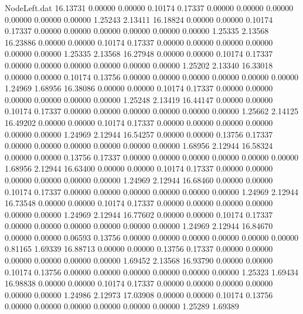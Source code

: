 \begin{filecontents}{NodeLeft.dat}
  16.13731    0.00000    0.00000     0.10174    0.17337    0.00000    0.00000    0.00000    0.00000    0.00000    0.00000    1.25243    2.13411
  16.18824    0.00000    0.00000     0.10174    0.17337    0.00000    0.00000    0.00000    0.00000    0.00000    0.00000    1.25335    2.13568
  16.23886    0.00000    0.00000     0.10174    0.17337    0.00000    0.00000    0.00000    0.00000    0.00000    0.00000    1.25335    2.13568
  16.27948    0.00000    0.00000     0.10174    0.17337    0.00000    0.00000    0.00000    0.00000    0.00000    0.00000    1.25202    2.13340
  16.33018    0.00000    0.00000     0.10174    0.13756    0.00000    0.00000    0.00000    0.00000    0.00000    0.00000    1.24969    1.68956
  16.38086    0.00000    0.00000     0.10174    0.17337    0.00000    0.00000    0.00000    0.00000    0.00000    0.00000    1.25248    2.13419
  16.44147    0.00000    0.00000     0.10174    0.17337    0.00000    0.00000    0.00000    0.00000    0.00000    0.00000    1.25662    2.14125
  16.49202    0.00000    0.00000     0.10174    0.17337    0.00000    0.00000    0.00000    0.00000    0.00000    0.00000    1.24969    2.12944
  16.54257    0.00000    0.00000     0.13756    0.17337    0.00000    0.00000    0.00000    0.00000    0.00000    0.00000    1.68956    2.12944
  16.58324    0.00000    0.00000     0.13756    0.17337    0.00000    0.00000    0.00000    0.00000    0.00000    0.00000    1.68956    2.12944
  16.63400    0.00000    0.00000     0.10174    0.17337    0.00000    0.00000    0.00000    0.00000    0.00000    0.00000    1.24969    2.12944
  16.68460    0.00000    0.00000     0.10174    0.17337    0.00000    0.00000    0.00000    0.00000    0.00000    0.00000    1.24969    2.12944
  16.73548    0.00000    0.00000     0.10174    0.17337    0.00000    0.00000    0.00000    0.00000    0.00000    0.00000    1.24969    2.12944
  16.77602    0.00000    0.00000     0.10174    0.17337    0.00000    0.00000    0.00000    0.00000    0.00000    0.00000    1.24969    2.12944
  16.84670    0.00000    0.00000     0.06593    0.13756    0.00000    0.00000    0.00000    0.00000    0.00000    0.00000    0.81165    1.69339
  16.88713    0.00000    0.00000     0.13756    0.17337    0.00000    0.00000    0.00000    0.00000    0.00000    0.00000    1.69452    2.13568
  16.93790    0.00000    0.00000     0.10174    0.13756    0.00000    0.00000    0.00000    0.00000    0.00000    0.00000    1.25323    1.69434
  16.98838    0.00000    0.00000     0.10174    0.17337    0.00000    0.00000    0.00000    0.00000    0.00000    0.00000    1.24986    2.12973
  17.03908    0.00000    0.00000     0.10174    0.13756    0.00000    0.00000    0.00000    0.00000    0.00000    0.00000    1.25289    1.69389

\end{filecontents}
